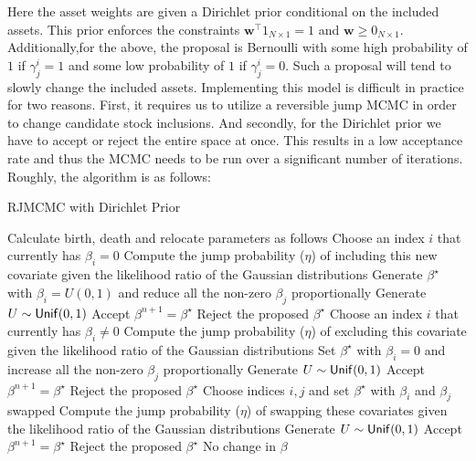 \documentclass[a4paper, 12pt]{article}
\theoremstyle{plain}
\theoremstyle{definition}
\theoremstyle{remark}
\newcommand{\unif}{{\sf Unif}}
\begin{document}
Here the asset weights are given a Dirichlet prior conditional on the included assets.  This prior enforces the constraints $\textbf{w}^\top 1_{N\times 1}=1$ and $\textbf{w}\geq 0_{N\times 1}$. Additionally,for the above, the proposal is Bernoulli with some high probability of $1$ if $\gamma^i_j =1$ and some low probability of $1$ if $\gamma^i_j =0$. Such a proposal will tend to slowly change the included assets. Implementing this model is difficult in practice for two reasons. First, it requires us to utilize a reversible jump MCMC in order to change candidate stock inclusions. And secondly, for the Dirichlet prior we have to accept or reject the entire space at once. This results in a low acceptance rate and thus the MCMC needs to be run over a significant number of iterations. Roughly, the algorithm is as follows:

\begin{algorithm}
\caption{RJMCMC with Dirichlet Prior}
\begin{algorithmic} [1]
\STATE Calculate birth, death and relocate parameters as follows
	\ELSE
	\ENDIF
	\ELSE
	\ENDIF
	\STATE Choose an index $i$ that currently has $\beta_i=0$
	\STATE Compute the jump probability ($\eta$) of including this new covariate given the likelihood ratio of the Gaussian distributions
	\STATE Generate $\beta^\star$ with $\beta_i=U(0,1)$ and reduce all the non-zero $\beta_j$ proportionally
	\STATE Generate $U\sim \unif(0,1)$
		\STATE Accept $\beta^{n+1}=\beta^\star$
	\ELSE
		\STATE Reject the proposed $\beta^\star$
	\ENDIF
{}
	\STATE Choose an index $i$ that currently has $\beta_i \neq 0$
	\STATE Compute the jump probability ($\eta$) of excluding this covariate given the likelihood ratio of the Gaussian distributions
	\STATE Set $\beta^\star$ with $\beta_i=0$ and increase all the non-zero $\beta_j$ proportionally
	\STATE Generate $U\sim \unif(0,1)$
		\STATE Accept $\beta^{n+1}=\beta^\star$
	\ELSE
		\STATE Reject the proposed $\beta^\star$
	\ENDIF
{}
	\STATE Choose indices $i, j$ and set $\beta^\star$ with $\beta_i$ and $\beta_j$ swapped
	\STATE Compute the jump probability ($\eta$) of swapping these covariates given the likelihood ratio of the Gaussian distributions
	\STATE Generate $U\sim \unif(0,1)$
		\STATE Accept $\beta^{n+1}=\beta^\star$
	\ELSE
		\STATE Reject the proposed $\beta^\star$
	\ENDIF
\ELSE
	\STATE No change in $\beta$
\ENDIF
\ENDWHILE
\end{algorithmic}
\end{algorithm}
\end{document}
